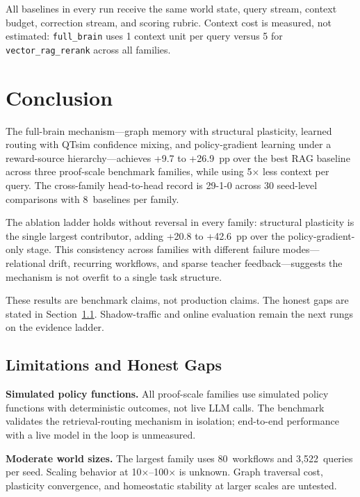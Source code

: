 \documentclass[11pt]{article}
\begin{document}
All baselines in every run receive the same world state, query stream, context
budget, correction stream, and scoring rubric. Context cost is measured, not
estimated: \texttt{full\_brain} uses 1 context unit per query versus 5 for
\texttt{vector\_rag\_rerank} across all families.

\section{Conclusion}
\label{sec:conclusion}

The full-brain mechanism---graph memory with structural plasticity, learned
routing with QTsim confidence mixing, and policy-gradient learning under a
reward-source hierarchy---achieves +9.7 to +26.9~pp over the best RAG baseline
across three proof-scale benchmark families, while using 5$\times$ less context
per query. The cross-family head-to-head record is 29-1-0 across 30 seed-level
comparisons with 8~baselines per family.

The ablation ladder holds without reversal in every family: structural plasticity
is the single largest contributor, adding +20.8 to +42.6~pp over the
policy-gradient-only stage. This consistency across families with different
failure modes---relational drift, recurring workflows, and sparse teacher
feedback---suggests the mechanism is not overfit to a single task structure.

These results are benchmark claims, not production claims. The honest gaps are
stated in Section~\ref{sec:limitations}. Shadow-traffic and online evaluation
remain the next rungs on the evidence ladder.

\subsection{Limitations and Honest Gaps}
\label{sec:limitations}

\textbf{Simulated policy functions.} All proof-scale families use simulated
policy functions with deterministic outcomes, not live LLM calls. The benchmark
validates the retrieval-routing mechanism in isolation; end-to-end performance
with a live model in the loop is unmeasured.

\textbf{Moderate world sizes.} The largest family uses 80~workflows and
3{,}522~queries per seed. Scaling behavior at 10$\times$--100$\times$ is
unknown. Graph traversal cost, plasticity convergence, and homeostatic stability
at larger scales are untested.
\end{document}
